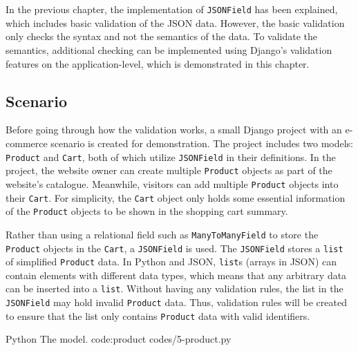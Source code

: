 \chapter{\babLima}

In the previous chapter, the implementation of \verb|JSONField| has been
explained, which includes basic validation of the JSON data. However, the basic
validation only checks the syntax and not the semantics of the data. To
validate the semantics, additional checking can be implemented using Django's
validation features on the application-level, which is demonstrated in this
chapter.

\section{Scenario}

Before going through how the validation works, a small Django project with an
e-commerce scenario is created for demonstration. The project includes two
models: \verb|Product| and \verb|Cart|, both of which utilize \verb|JSONField|
in their definitions. In the project, the website owner can create multiple
\verb|Product| objects as part of the website's catalogue. Meanwhile, visitors
can add multiple \verb|Product| objects into their \verb|Cart|. For simplicity,
the \verb|Cart| object only holds some essential information of the
\verb|Product| objects to be shown in the shopping cart summary.

Rather than using a relational field such as \verb|ManyToManyField| to store
the \verb|Product| objects in the \verb|Cart|, a \verb|JSONField| is used. The
\verb|JSONField| stores a \verb|list| of simplified \verb|Product| data. In
Python and JSON, \verb|list|s (arrays in JSON) can contain elements with
different data types, which means that any arbitrary data can be inserted into
a \verb|list|. Without having any validation rules, the list in the
\verb|JSONField| may hold invalid \verb|Product| data. Thus, validation rules
will be created to ensure that the list only contains \verb|Product| data with
valid identifiers.

\listing
{Python}
{The  model.}
{code:product}
{codes/5-product.py}

